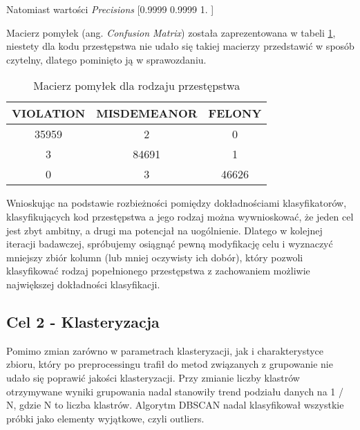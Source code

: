\documentclass{classrep}
\begin{document}
{{    Natomiast wartości \textit{Precisions} [0.9999 0.9999 1.    ]
        }
        
        Macierz pomyłek (ang. \textit{Confusion Matrix}) została zaprezentowana w tabeli \ref{tab:forest_forest_confusion_matrix_law_breaking_law}, niestety dla kodu przestępstwa nie udało się takiej macierzy przedstawić w sposób czytelny, dlatego pominięto ją w sprawozdaniu.
        \begin{table}[!htbp]
\centering
\begin{tabular}{|c|c|c|}
\hline
VIOLATION & MISDEMEANOR & FELONY\\ \hline
35959 & 2 & 0 \\ \hline
3 & 84691 & 1 \\ \hline
0 & 3 & 46626 \\ \hline
\end{tabular}
\caption
{Macierz pomyłek dla rodzaju przestępstwa}
\label{tab:forest_forest_confusion_matrix_law_breaking_law}
\end{table}
\FloatBarrier
Wnioskując na podstawie rozbieżności pomiędzy dokładnościami klasyfikatorów, klasyfikujących kod przestępstwa a jego rodzaj można wywnioskować, że jeden cel jest zbyt ambitny, a drugi ma potencjał na uogólnienie. Dlatego w kolejnej iteracji badawczej, spróbujemy osiągnąć pewną modyfikację celu i wyznaczyć mniejszy zbiór kolumn (lub mniej oczywisty ich dobór), który pozwoli klasyfikować rodzaj popełnionego przestępstwa z zachowaniem możliwie największej dokładności klasyfikacji.

        \subsection{Cel 2 - Klasteryzacja} {
            Pomimo zmian zarówno w parametrach klasteryzacji, jak i charakterystyce zbioru, który po preprocessingu trafił do metod związanych z grupowanie nie udało się poprawić jakości klasteryzacji. Przy zmianie liczby klastrów otrzymywane wyniki grupowania nadal stanowiły trend podziału danych na 1 / N, gdzie N to liczba klastrów. Algorytm DBSCAN nadal klasyfikował wszystkie próbki jako elementy wyjątkowe, czyli outliers. 
        }

    }

    \begin{thebibliography}{0}
    \end{thebibliography}
\end{document}
